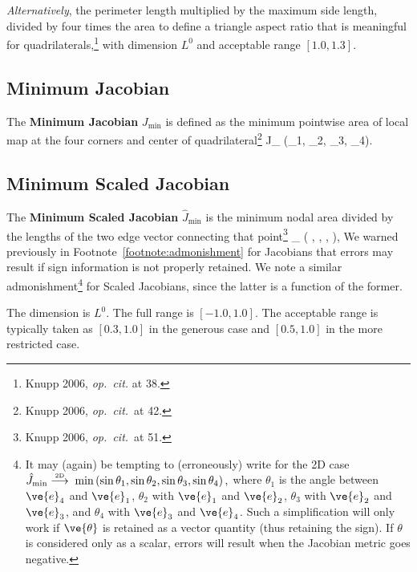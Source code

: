 \documentclass[14pt,letterpaper,fleqn]{extreport}
\begin{document}
{\em Alternatively}, the perimeter length multiplied by the maximum side length, 
divided by four times the area to define a triangle aspect ratio that is 
meaningful for quadrilaterals,\footnote{Knupp 2006, {\em op.~cit.} at 38.} with 
dimension $L^0$ and acceptable range $[1.0, 1.3]$.


\subsection{Minimum Jacobian}
The {\bf Minimum Jacobian} $J_{\min}$ is defined as the minimum pointwise area of local 
map at the four corners and center of quadrilateral\footnote{Knupp 2006, {\em op.~cit.}~at 42.}
\be 
J_{\min}  \min \left(\alpha_1, \alpha_2, \alpha_3, \alpha_4\right).
\ee 

\subsection{Minimum Scaled Jacobian}

The {\bf Minimum Scaled Jacobian} $\hat{J}_{\min}$ is the minimum nodal area divided by the 
lengths of the two edge vector connecting that point\footnote{Knupp 2006, {\em op.~cit.}~at 51.}
\be 
{}_{\min}  \min
  \left(
    , 
    ,
    ,
  \right),
\ee 
%
We warned previously in Footnote~\ref{footnote:admonishment} for Jacobians that 
errors may result if sign information is not properly retained.  We 
note a similar admonishment\footnote{It may (again) be tempting to (erroneously) 
write for the 2D case 
$\hat{J}_{\min} \overset{\tiny \mbox{2D}}{\longrightarrow} \; \min
  \left(
    \sin \theta_1, \sin \theta_2, \sin \theta_3, \sin \theta_4
  \right),$
where $\theta_1$ is the angle between $\ve{e}_4$ and $\ve{e}_1$, 
$\theta_2$ with $\ve{e}_1$ and $\ve{e}_2$, 
$\theta_3$ with $\ve{e}_2$ and $\ve{e}_3$, and
$\theta_4$ with $\ve{e}_3$ and $\ve{e}_4$.
Such a simplification will only work if $\ve{\theta}$ is retained as a vector quantity (thus 
retaining the sign).  If $\theta$ is considered only as a scalar, errors will result when
the Jacobian metric goes negative.} for Scaled Jacobians, since the latter is a function of the
former.

The dimension is $L^0$.  
The full range is  $[-1.0, 1.0]$.  
The acceptable range is typically taken as $[0.3, 1.0]$ in the generous case and 
$[0.5, 1.0]$ in the more restricted case.
\end{document}
